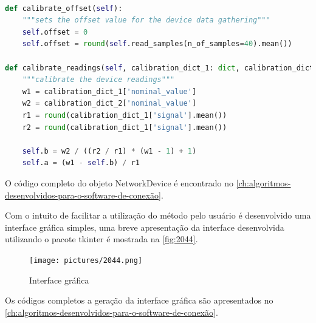 \begin{lstlisting}[label={lst:objectcalibration},language=Python,caption={{Métodos de calibração do objeto NetworkDevice}}]

def calibrate_offset(self):
	"""sets the offset value for the device data gathering"""
	self.offset = 0
	self.offset = round(self.read_samples(n_of_samples=40).mean())

def calibrate_readings(self, calibration_dict_1: dict, calibration_dict_2: dict):
	"""calibrate the device readings"""
	w1 = calibration_dict_1['nominal_value']
	w2 = calibration_dict_2['nominal_value']
	r1 = round(calibration_dict_1['signal'].mean())
	r2 = round(calibration_dict_1['signal'].mean())

	self.b = w2 / ((r2 / r1) * (w1 - 1) + 1)
	self.a = (w1 - self.b) / r1

\end{lstlisting}

O código completo do objeto NetworkDevice é encontrado no \autoref{ch:algoritmos-desenvolvidos-para-o-software-de-conexão}.

Com o intuito de facilitar a utilização do método pelo usuário é desenvolvido uma interface gráfica simples, uma breve apresentação da interface desenvolvida utilizando o pacote tkinter é
mostrada na \autoref{fig:2044}.

\begin{figure}[H]
	\caption{\label{fig:2044} Interface gráfica}
		\begin{center}
			\texttt{[image: pictures/2044.png]}
		\end{center}
\end{figure}

Os códigos completos a geração da interface gráfica são apresentados no \autoref{ch:algoritmos-desenvolvidos-para-o-software-de-conexão}.
